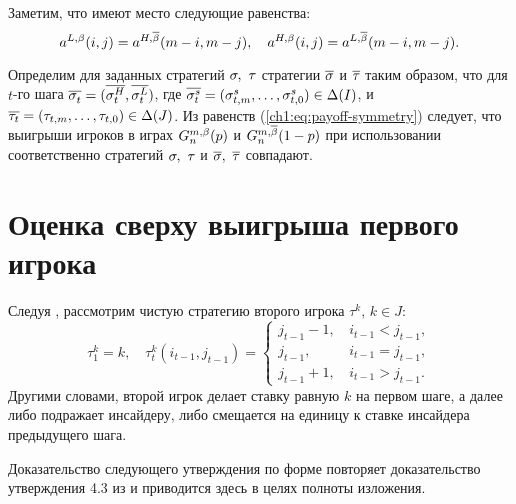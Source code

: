 {Заметим, что имеют место следующие равенства:
\begin{equation}
  \label{ch1:eq:payoff-symmetry}
  \as[L][\Co](i, j) = \as[H][\DCo](m-i, m-j), \quad
  \as[H][\Co](i, j) = \as[L][\DCo](m-i, m-j).
\end{equation}

\begin{remark}
  \label{ch1:rem:symm-payoffs}
  Определим для заданных стратегий $\sigmar,\ \taur$ стратегии $\symm{\sigmar}$ и $\symm{\taur}$ таким образом, что для $t$-го шага
  $\symm{\sigmas{t}} = (\symm{\sigmas[H]{t}}, \symm{\sigmas[L]{t}})$, где
  $\symm{\sigmas[s]{t}}=(\sigmasc[s][t]{m},\ldots,\sigmasc[s][t]{0}) \in \Delta(I)$, и
  $\symm{\taus{t}} = (\tausc[t]{m},\ldots,\tausc[t]{0}) \in \Delta(J)$.
  Из равенств (\ref{ch1:eq:payoff-symmetry}) следует, что выигрыши игроков в играх $\theG*[\Co]{n}(p)$ и $\theG*[\DCo]{n}(1-p)$ при использовании соответственно стратегий $\sigmar,\ \taur$ и $\symm{\sigmar},\ \symm{\taur}$ совпадают.
\end{remark}

\section{Оценка сверху выигрыша первого игрока}\label{ch1:upper-bound}
Следуя \cite{domansky07}, рассмотрим чистую стратегию второго игрока $\tau^k, \, k \in J$:
\[
  \tau^k_1 = k, \quad \tau^k_t(i_{t-1}, j_{t-1}) = \begin{cases}
    j_{t-1} - 1, & \, i_{t-1} < j_{t-1}, \\
    j_{t-1},     & \, i_{t-1} = j_{t-1}, \\
    j_{t-1} + 1, & \, i_{t-1} > j_{t-1}.
  \end{cases}
\]
Другими словами, второй игрок делает ставку равную $k$ на первом шаге, а далее либо подражает инсайдеру, либо смещается на единицу к ставке инсайдера предыдущего шага.

Доказательство следующего утверждения по форме повторяет доказательство утверждения 4.3 из \cite{domansky07} и приводится здесь в целях полноты изложения.

}
